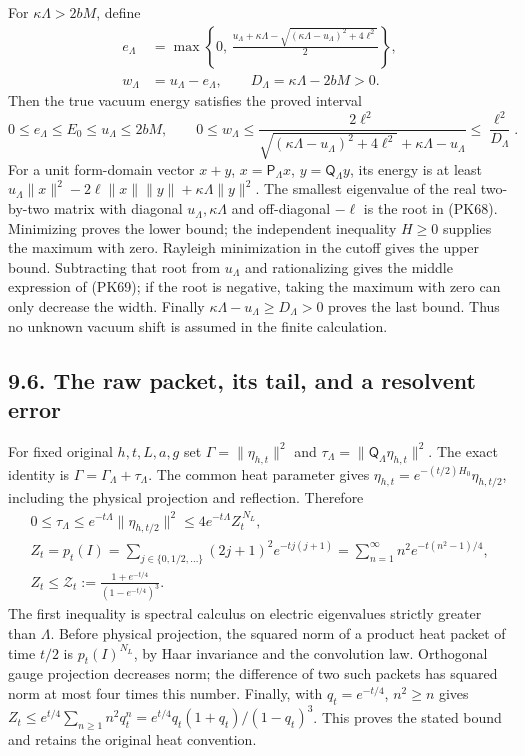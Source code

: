 \documentclass[11pt]{article}
\begin{document}
For \(\kappa\Lambda>2bM\), define
\[
 \begin{aligned}
 e_\Lambda&=\max\left\{0,\,
  \frac{u_\Lambda+\kappa\Lambda
    -\sqrt{(\kappa\Lambda-u_\Lambda)^2+4\ell^2}}2\right\},\\
 w_\Lambda&=u_\Lambda-e_\Lambda,\qquad
 D_\Lambda=\kappa\Lambda-2bM>0 .
 \end{aligned}\tag{PK68}
\]
Then the true vacuum energy satisfies the proved interval
\[
 0\le e_\Lambda\le E_0\le u_\Lambda\le2bM,\qquad
 0\le w_\Lambda\le
 \frac{2\ell^2}{
 \sqrt{(\kappa\Lambda-u_\Lambda)^2+4\ell^2}
       +\kappa\Lambda-u_\Lambda}
 \le\frac{\ell^2}{D_\Lambda}.
 \tag{PK69}
\]
For a unit form-domain vector \(x+y\), \(x=\mathsf P_\Lambda x\),
\(y=\mathsf Q_\Lambda y\), its energy is at least
\(u_\Lambda\|x\|^2-2\ell\|x\|\|y\|
+\kappa\Lambda\|y\|^2\).
The smallest eigenvalue of the real two-by-two matrix with diagonal
\(u_\Lambda,\kappa\Lambda\) and off-diagonal \(-\ell\) is the root
in (PK68). Minimizing proves the lower bound; the independent inequality
\(H\ge0\) supplies the maximum with zero. Rayleigh minimization in the
cutoff gives the upper bound. Subtracting that root from \(u_\Lambda\)
and rationalizing gives the middle expression of (PK69); if the root is
negative, taking the maximum with zero can only decrease the width.
Finally \(\kappa\Lambda-u_\Lambda\ge D_\Lambda>0\) proves the last bound.
Thus no unknown vacuum shift is assumed in the finite calculation.

\subsection*{9.6. The raw packet, its tail, and a resolvent error}

For fixed original \(h,t,L,a,g\) set
\(\Gamma=\|\eta_{h,t}\|^2\) and
\(\tau_\Lambda=\|\mathsf Q_\Lambda\eta_{h,t}\|^2\).
The exact identity is \(\Gamma=\Gamma_\Lambda+\tau_\Lambda\).
The common heat parameter gives
\(\eta_{h,t}=e^{-(t/2)H_0}\eta_{h,t/2}\), including the physical
projection and reflection. Therefore
\[
 \begin{gathered}
 0\le\tau_\Lambda\le
 e^{-t\Lambda}\|\eta_{h,t/2}\|^2
 \le 4e^{-t\Lambda}Z_t^{\,N_L},\\
 Z_t=p_t(I)=
 \sum_{j\in\{0,1/2,\ldots\}}(2j+1)^2e^{-tj(j+1)}
 =\sum_{n=1}^\infty n^2e^{-t(n^2-1)/4},\\
 Z_t\le\mathcal Z_t:=
 \frac{1+e^{-t/4}}{(1-e^{-t/4})^3}.
 \end{gathered}\tag{PK70}
\]
The first inequality is spectral calculus on electric eigenvalues
strictly greater than \(\Lambda\). Before physical projection, the squared
norm of a product heat packet of time \(t/2\) is \(p_t(I)^{N_L}\),
by Haar invariance and the convolution law. Orthogonal gauge projection
decreases norm; the difference of two such packets has squared norm at
most four times this number. Finally, with \(q_t=e^{-t/4}\),
\(n^2\ge n\) gives
\(Z_t\le e^{t/4}\sum_{n\ge1}n^2q_t^n
=e^{t/4}q_t(1+q_t)/(1-q_t)^3\).
This proves the stated bound and retains the original heat convention.
\end{document}

